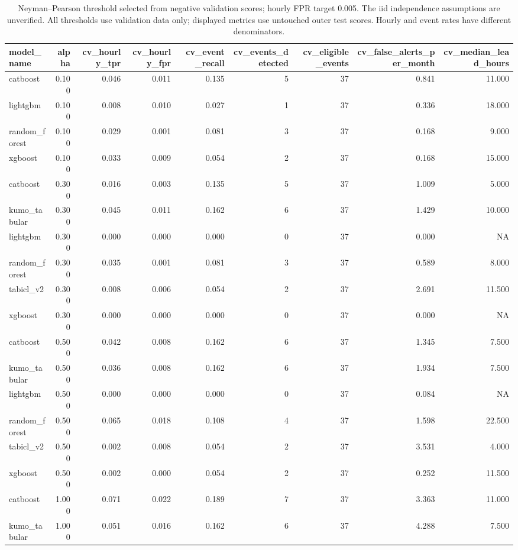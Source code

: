 \begin{table}
\caption{Neyman--Pearson threshold selected from negative validation scores; hourly FPR target 0.005. The iid independence assumptions are unverified. All thresholds use validation data only; displayed metrics use untouched outer test scores. Hourly and event rates have different denominators.}
\begin{tabular}{lrrrrrrrr}
\toprule
model\_name & alpha & cv\_hourly\_tpr & cv\_hourly\_fpr & cv\_event\_recall & cv\_events\_detected & cv\_eligible\_events & cv\_false\_alerts\_per\_month & cv\_median\_lead\_hours \\
\midrule
catboost & 0.100 & 0.046 & 0.011 & 0.135 & 5 & 37 & 0.841 & 11.000 \\
lightgbm & 0.100 & 0.008 & 0.010 & 0.027 & 1 & 37 & 0.336 & 18.000 \\
random\_forest & 0.100 & 0.029 & 0.001 & 0.081 & 3 & 37 & 0.168 & 9.000 \\
xgboost & 0.100 & 0.033 & 0.009 & 0.054 & 2 & 37 & 0.168 & 15.000 \\
catboost & 0.300 & 0.016 & 0.003 & 0.135 & 5 & 37 & 1.009 & 5.000 \\
kumo\_tabular & 0.300 & 0.045 & 0.011 & 0.162 & 6 & 37 & 1.429 & 10.000 \\
lightgbm & 0.300 & 0.000 & 0.000 & 0.000 & 0 & 37 & 0.000 & NA \\
random\_forest & 0.300 & 0.035 & 0.001 & 0.081 & 3 & 37 & 0.589 & 8.000 \\
tabicl\_v2 & 0.300 & 0.008 & 0.006 & 0.054 & 2 & 37 & 2.691 & 11.500 \\
xgboost & 0.300 & 0.000 & 0.000 & 0.000 & 0 & 37 & 0.000 & NA \\
catboost & 0.500 & 0.042 & 0.008 & 0.162 & 6 & 37 & 1.345 & 7.500 \\
kumo\_tabular & 0.500 & 0.036 & 0.008 & 0.162 & 6 & 37 & 1.934 & 7.500 \\
lightgbm & 0.500 & 0.000 & 0.000 & 0.000 & 0 & 37 & 0.084 & NA \\
random\_forest & 0.500 & 0.065 & 0.018 & 0.108 & 4 & 37 & 1.598 & 22.500 \\
tabicl\_v2 & 0.500 & 0.002 & 0.008 & 0.054 & 2 & 37 & 3.531 & 4.000 \\
xgboost & 0.500 & 0.002 & 0.000 & 0.054 & 2 & 37 & 0.252 & 11.500 \\
catboost & 1.000 & 0.071 & 0.022 & 0.189 & 7 & 37 & 3.363 & 11.000 \\
kumo\_tabular & 1.000 & 0.051 & 0.016 & 0.162 & 6 & 37 & 4.288 & 7.500 \\

\end{tabular}
\end{table}
